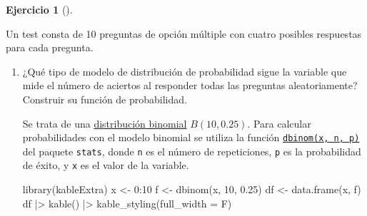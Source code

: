 \documentclass[
  a4paper,
]{scrreport}
\newenvironment{Shaded}{\begin{snugshade}}{\end{snugshade}}
\newcommand{\AttributeTok}[1]{\textcolor[rgb]{0.40,0.45,0.13}{#1}}
\newcommand{\DecValTok}[1]{\textcolor[rgb]{0.68,0.00,0.00}{#1}}
\newcommand{\FloatTok}[1]{\textcolor[rgb]{0.68,0.00,0.00}{#1}}
\newcommand{\FunctionTok}[1]{\textcolor[rgb]{0.28,0.35,0.67}{#1}}
\newcommand{\NormalTok}[1]{\textcolor[rgb]{0.00,0.23,0.31}{#1}}
\newcommand{\OtherTok}[1]{\textcolor[rgb]{0.00,0.23,0.31}{#1}}
\newcommand{\SpecialCharTok}[1]{\textcolor[rgb]{0.37,0.37,0.37}{#1}}
\theoremstyle{definition}
\newtheorem{exercise}{Ejercicio}[chapter]
\theoremstyle{remark}
\begin{document}
\begin{exercise}[]\protect\hypertarget{exr-distribuciones-probabilidad-2}{}\label{exr-distribuciones-probabilidad-2}

Un test consta de 10 preguntas de opción múltiple con cuatro posibles
respuestas para cada pregunta.

\begin{enumerate}
\def\labelenumi{\alph{enumi}.}
\item
  ¿Qué tipo de modelo de distribución de probabilidad sigue la variable
  que mide el número de aciertos al responder todas las preguntas
  aleatoriamente? Construir su función de probabilidad.

  \begin{tcolorbox}[enhanced jigsaw, breakable, toptitle=1mm, colbacktitle=quarto-callout-tip-color!10!white, rightrule=.15mm, opacityback=0, opacitybacktitle=0.6, titlerule=0mm, coltitle=black, colframe=quarto-callout-tip-color-frame, colback=white, bottomtitle=1mm, leftrule=.75mm, toprule=.15mm, title=\textcolor{quarto-callout-tip-color}{\faLightbulb}\hspace{0.5em}{Solución}, arc=.35mm, bottomrule=.15mm, left=2mm]

  Se trata de una
  \href{https://es.wikipedia.org/wiki/Distribuci\%C3\%B3n_binomial}{distribución
  binomial} \(B(10, 0.25)\). Para calcular probabilidades con el modelo
  binomial se utiliza la función
  \href{https://www.rdocumentation.org/packages/stats/versions/3.3/topics/Binomial}{\texttt{dbinom(x,\ n,\ p)}}
  del paquete \texttt{stats}, donde \texttt{n} es el número de
  repeticiones, \texttt{p} es la probabilidad de éxito, y \texttt{x} es
  el valor de la variable.

\begin{Shaded}
\begin{Highlighting}[]
\FunctionTok{library}\NormalTok{(kableExtra)}
\NormalTok{x }\OtherTok{\textless{}{-}} \DecValTok{0}\SpecialCharTok{:}\DecValTok{10}
\NormalTok{f }\OtherTok{\textless{}{-}} \FunctionTok{dbinom}\NormalTok{(x, }\DecValTok{10}\NormalTok{, }\FloatTok{0.25}\NormalTok{)}
\NormalTok{df }\OtherTok{\textless{}{-}} \FunctionTok{data.frame}\NormalTok{(x, f)}
\NormalTok{df }\SpecialCharTok{|\textgreater{}} 
    \FunctionTok{kable}\NormalTok{() }\SpecialCharTok{|\textgreater{}} 
    \FunctionTok{kable\_styling}\NormalTok{(}\AttributeTok{full\_width =}\NormalTok{ F)}
\end{Highlighting}
\end{Shaded}


\end{tcolorbox}
\end{enumerate}
\end{exercise}
\end{document}
